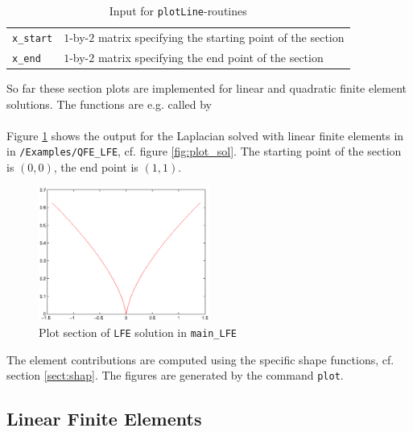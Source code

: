 \begin{table}[htb]
  \centering
  \begin{tabular}{p{1cm}p{10cm}}
    {\tt x\_start} & {\small $1$-by-$2$ matrix specifying the starting point of the section} \\
    {\tt x\_end} & {\small $1$-by-$2$ matrix specifying the end point of the section}
  \end{tabular}
  \caption{Input for {\tt plotLine}-routines}
  \label{tab:plotline_in}
\end{table}

 So far these section plots are implemented for linear and quadratic finite element solutions. The functions are e.g. called by \\

 \\

 Figure \ref{fig:plot_line_sol} shows the output for the Laplacian solved with linear finite elements in  in {\tt /Examples/QFE\_LFE}, cf. figure \ref{fig:plot_sol}. The starting point of the section is $(0,0)$, the end point is $(1,1)$. \\

\begin{figure}[htb]
  \centering
  \includegraphics[width=0.5\textwidth]{main_LFE_fig2.eps}
  \caption{Plot section of {\tt LFE} solution in {\tt main\_LFE}}
  \label{fig:plot_line_sol}
\end{figure}

 The element contributions are computed using the specific shape functions, cf. section \ref{sect:shap}. The figures are generated by the \MATLAB command {\tt plot}.



\subsection{Linear Finite Elements} 

